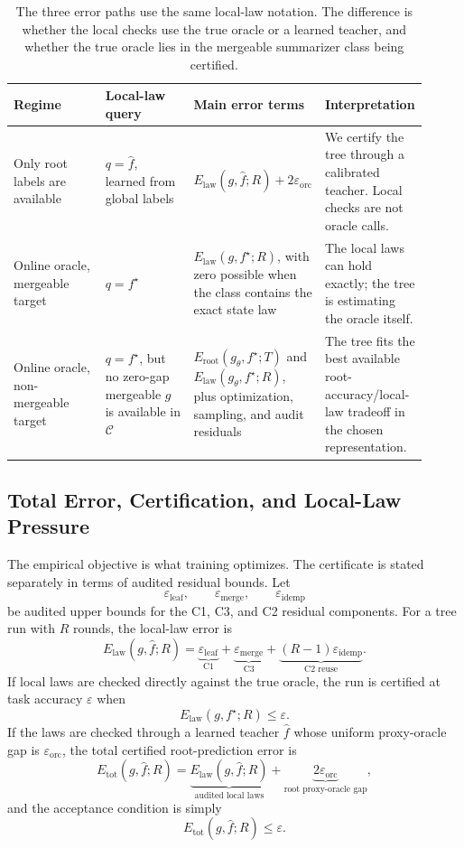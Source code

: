 \begin{table}[t]
\centering
\small
\setlength{\tabcolsep}{4pt}
\begin{tabular}{@{}p{0.23\linewidth}p{0.22\linewidth}p{0.25\linewidth}p{0.21\linewidth}@{}}
\toprule
Regime & Local-law query & Main error terms & Interpretation \\
\midrule
Only root labels are available &
\(q=\widehat f\), learned from global labels &
\(E_{\mathrm{law}}(g,\widehat f;R)+2\varepsilon_{\mathrm{orc}}\) &
We certify the tree through a calibrated teacher. Local checks are not
oracle calls. \\
Online oracle, mergeable target &
\(q=f^\star\) &
\(E_{\mathrm{law}}(g,f^\star;R)\), with zero possible when the class
contains the exact state law &
The local laws can hold exactly; the tree is estimating the oracle
itself. \\
Online oracle, non-mergeable target &
\(q=f^\star\), but no zero-gap mergeable \(g\) is available in
\(\mathcal C\) &
\(E_{\mathrm{root}}(g_\theta,f^\star;T)\) and
\(E_{\mathrm{law}}(g_\theta,f^\star;R)\), plus optimization, sampling,
and audit residuals &
The tree fits the best available root-accuracy/local-law tradeoff in
the chosen representation. \\
\bottomrule
\end{tabular}
\caption{The three error paths use the same local-law notation. The
difference is whether the local checks use the true oracle or a learned
teacher, and whether the true oracle lies in the mergeable summarizer
class being certified.}
\label{tab:v7-error-paths}
\end{table}

\subsection{Total Error, Certification, and Local-Law Pressure}
\label{app:v7-certified-objective}

The empirical objective is what training optimizes. The certificate is
stated separately in terms of audited residual bounds. Let
\[
  \varepsilon_{\mathrm{leaf}},\qquad
  \varepsilon_{\mathrm{merge}},\qquad
  \varepsilon_{\mathrm{idemp}}
\]
be audited upper bounds for the C1, C3, and C2 residual components.
For a tree run with \(R\) rounds, the local-law error is
\[
  E_{\mathrm{law}}(g,\widehat f;R)
  =
  \underbrace{\varepsilon_{\mathrm{leaf}}}_{\text{C1}}
  +
  \underbrace{\varepsilon_{\mathrm{merge}}}_{\text{C3}}
  +
  \underbrace{(R-1)\varepsilon_{\mathrm{idemp}}}_{\text{C2 reuse}}.
\]
If local laws are checked directly against the true oracle, the run is
certified at task accuracy \(\varepsilon\) when
\[
  E_{\mathrm{law}}(g,f^\star;R)\le \varepsilon.
\]
If the laws are checked through a learned teacher \(\widehat f\) whose
uniform proxy-oracle gap is \(\varepsilon_{\mathrm{orc}}\), the total certified
root-prediction error is
\[
  E_{\mathrm{tot}}(g,\widehat f;R)
  =
  \underbrace{E_{\mathrm{law}}(g,\widehat f;R)}
    _{\text{audited local laws}}
  +
  \underbrace{2\varepsilon_{\mathrm{orc}}}
    _{\text{root proxy-oracle gap}},
\]
and the acceptance condition is simply
\[
  E_{\mathrm{tot}}(g,\widehat f;R)\le \varepsilon.
\]

